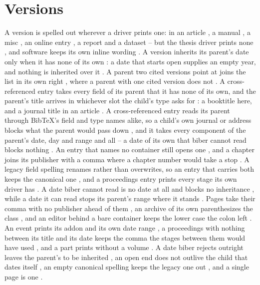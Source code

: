 \documentclass[acmsmall,nonacm,natbib=false]{acmart}
\begin{document}
\thispagestyle{empty}

\section*{Versions}
A version is spelled out wherever a driver prints one: in an article \cite{VerArticle}, a manual \cite{VerManual}, a misc \cite{VerMisc}, an online entry \cite{VerOnline}, a report \cite{VerReport} and a dataset \cite{VerDataset} -- but the thesis driver prints none \cite{VerThesis}, and software keeps its own inline wording \cite{NdSoftware}.
A version inherits its parent's date only when it has none of its own \cite{SwPlainChild}: a date that starts open supplies an empty year, and nothing is inherited over it \cite{SwOpenChild}.
A parent two cited versions point at joins the list in its own right \cite{SwOpenChild,SwPlainChild}, where a parent with one cited version does not \cite{SwLoneChild}.
A cross-referenced entry takes every field of its parent that it has none of its own, and the parent's title arrives in whichever slot the child's type asks for \cite{IhFirst,IhSecond}: a booktitle here, and a journal title in an article \cite{IhArticle}.
A cross-referenced entry reads its parent through BibTeX's field and type names alike, so a child's own journal or address blocks what the parent would pass down \cite{AlKid,AlConf}, and it takes every component of the parent's date, day and range and all \cite{DcKid} -- a date of its own that biber cannot read blocks nothing \cite{DrKid}.
An entry that names no container still opens one \cite{SoloIn}, and a chapter joins its publisher with a comma where a chapter number would take a stop \cite{PgBook}.
A legacy field spelling renames rather than overwrites, so an entry that carries both keeps the canonical one \cite{TwoSpellings}, and a proceedings entry prints every stage its own driver has \cite{FullProc}.
A date biber cannot read is no date at all and blocks no inheritance \cite{BogusKid}, while a date it can read stops its parent's range where it stands \cite{ChainKid}.
Pages take their comma with no publisher ahead of them \cite{NoPubPages}, an archive of its own parenthesizes the class \cite{CustomEprint}, and an editor behind a bare container keeps the lower case the colon left \cite{NoBookEditor}.
An event prints its addon and its own date range \cite{EvFull}, a proceedings with nothing between its title and its date keeps the comma the stages between them would have used \cite{PrMin,PrSer}, and a part prints without a volume \cite{PtOnly}.
A date biber rejects outright leaves the parent's to be inherited \cite{DtM13}, an open end does not outlive the child that dates itself \cite{OpKid}, an empty canonical spelling keeps the legacy one out \cite{EmCanon}, and a single page is one \cite{PgOne}.
\end{document}
